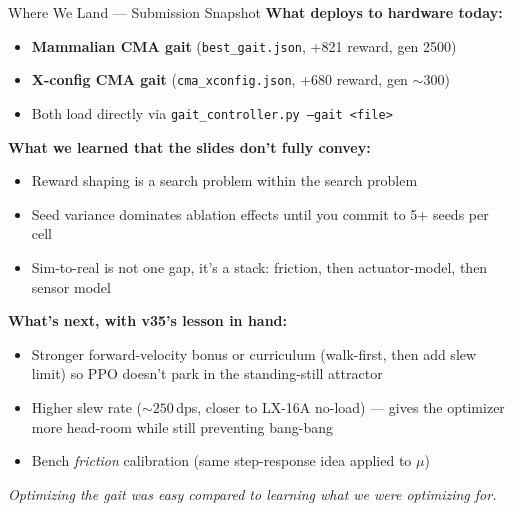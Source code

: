 \documentclass[aspectratio=169]{beamer}
\begin{document}
\begin{frame}{Where We Land --- Submission Snapshot}
\textbf{What deploys to hardware today:}
\begin{itemize}
    \item \textbf{Mammalian CMA gait} (\texttt{best\_gait.json}, +821 reward, gen 2500)
    \item \textbf{X-config CMA gait} (\texttt{cma\_xconfig.json}, +680 reward, gen $\sim$300)
    \item Both load directly via \texttt{gait\_controller.py --gait <file>}
\end{itemize}

\vspace{0.5em}
\textbf{What we learned that the slides don't fully convey:}
\begin{itemize}
    \item Reward shaping is a search problem within the search problem
    \item Seed variance dominates ablation effects until you commit to 5+ seeds per cell
    \item Sim-to-real is not one gap, it's a stack: friction, then actuator-model, then sensor model
\end{itemize}

\vspace{0.5em}
\textbf{What's next, with v35's lesson in hand:}
\begin{itemize}
    \item Stronger forward-velocity bonus or curriculum (walk-first, then add slew limit) so PPO doesn't park in the standing-still attractor
    \item Higher slew rate ($\sim 250\,$dps, closer to LX-16A no-load) --- gives the optimizer more head-room while still preventing bang-bang
    \item Bench \emph{friction} calibration (same step-response idea applied to $\mu$)
\end{itemize}

\vspace{0.5em}
\centering\textit{Optimizing the gait was easy compared to learning what we were optimizing for.}
\end{frame}
\end{document}
